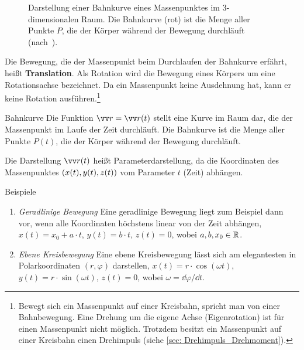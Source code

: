 \begin{figure}[h]
{%
    }
    \caption[Bahnkurve eines Massenpunktes im $3$-dimensionalen Raum]{Darstellung einer Bahnkurve eines Massenpunktes im $3$-dimensionalen Raum. Die Bahnkurve (rot) ist die Menge aller Punkte $P$, die der Körper während der Bewegung durchläuft (nach~\cite[S.~38]{Demtroeder2018}).}\label{fig: bahnkurve_allg}
\end{figure}
Die Bewegung, die der Massenpunkt beim Durchlaufen der Bahnkurve erfährt, heißt \textbf{Translation}. Als Rotation wird die Bewegung eines Körpers um eine Rotationsachse bezeichnet. Da ein Massenpunkt keine Ausdehnung hat, kann er keine Rotation ausführen.\footnote{Bewegt sich ein Massenpunkt auf einer Kreisbahn, spricht man von einer Bahnbewegung. Eine Drehung um die eigene Achse (Eigenrotation) ist für einen Massenpunkt nicht möglich. Trotzdem besitzt ein Massenpunkt auf einer Kreisbahn einen Drehimpuls (siehe \cref{sec: Drehimpuls_Drehmoment}).}
\begin{rememberbox}{Bahnkurve}
    Die Funktion $\ivec{r} = \ivec{r}(t)$ stellt eine Kurve im Raum dar, die der Massenpunkt im Laufe der Zeit durchläuft. Die Bahnkurve ist die Menge aller Punkte $P(t)$, die der Körper während der Bewegung durchläuft.
\end{rememberbox}
Die Darstellung $\ivec{r}(t)$ heißt Parameterdarstellung, da die Koordinaten des Massenpunktes $(x(t), y(t), z(t))$ vom Parameter $t$ (Zeit) abhängen.
\begin{examplebox}{Beispiele}
    \begin{enumerate}
        \item \textit{Geradlinige Bewegung}\newline
        Eine geradlinige Bewegung liegt zum Beispiel dann vor, wenn alle Koordinaten höchstens linear von der Zeit abhängen, \zB $x(t) = x_0 + a\cdot t$, $y(t) = b\cdot t$, $z(t) = 0$, wobei $a,b, x_0 \in \mathbb{R}$.
        \item \textit{Ebene Kreisbewegung} \newline
        Eine ebene Kreisbewegung lässt sich am elegantesten in Polarkoordinaten $(r,\varphi)$ darstellen, $x(t) = r\cdot \cos(\omega t)$, $y(t) = r\cdot \sin(\omega t)$, $z(t)=0$, wobei $\omega = \dd \varphi/\dd t$. 
    \end{enumerate}
\end{examplebox}


